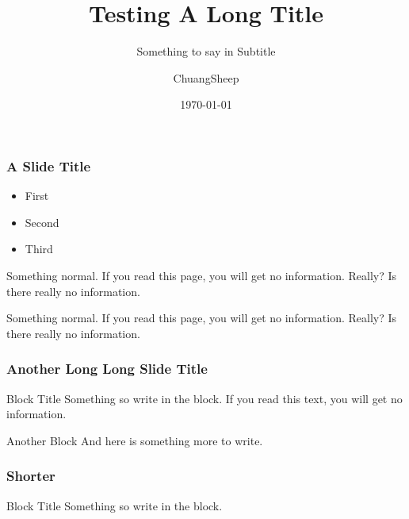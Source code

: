 \documentclass[american,aspectratio=169]{beamer}
\title{Testing A Long Title}
\subtitle{Something to say in Subtitle}
\date{\today}
\author{ChuangSheep}
\begin{document}
\begin{frame} 
  \titlepage
\end{frame} 


\begin{iframe}
  \frametitle{A Slide Title}

  \begin{itemize}
    \item First
    \item Second 
    \item Third
  \end{itemize}

  Something normal. If you read this page, you will get no information. Really? Is there really no information.

  Something normal. If you read this page, you will get no information. Really? Is there really no information.
\end{iframe}

\begin{indentedframe}
  \frametitle{Another Long Long Slide Title}
  \begin{block}{Block Title}
    Something so write in the block. If you read this text, you will get no information. 
  \end{block}
  \begin{block}{Another Block}
    And here is something more to write. 
  \end{block}
\end{indentedframe}

\begin{indentedframe}
  \frametitle{Shorter}
  \begin{block}{Block Title}
    Something so write in the block. 
  \end{block}
\end{indentedframe}

\end{document}
